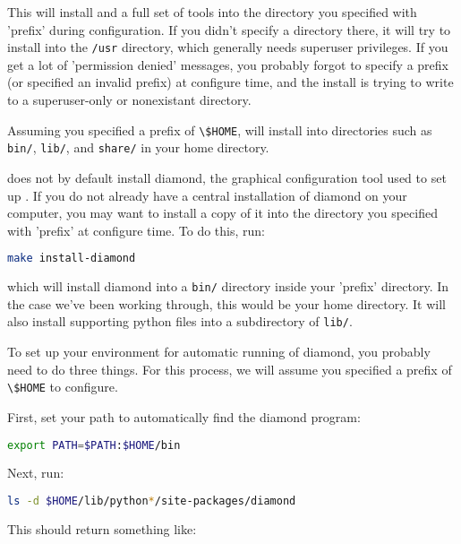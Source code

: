 This will install \fluidity and a full set of \fluidity tools into the
directory you specified with 'prefix' during configuration. If you didn't
specify a directory there, it will try to install into the
\lstinline[language=Bash]+/usr+ directory, which generally needs superuser
privileges. If you get a lot of 'permission denied' messages, you probably
forgot to specify a prefix (or specified an invalid prefix) at configure time,
and the install is trying to write to a superuser-only or nonexistant
directory. 

Assuming you specified a prefix of \lstinline[language=Bash]+\$HOME+, \fluidity
will install into directories such as \lstinline[language=Bash]+bin/+,
\lstinline[language=Bash]+lib/+, and \lstinline[language=Bash]+share/+ in your
home directory.

\fluidity does not by default install diamond, the graphical configuration tool
used to set up \fluidity. If you do not already have a central installation of
diamond on your computer, you may want to install a copy of it into the
directory you specified with 'prefix' at configure time. To do this, run:

\begin{lstlisting}[language=Bash]
make install-diamond
\end{lstlisting}

which will install diamond into a \lstinline[language=Bash]+bin/+ directory
inside your 'prefix' directory. In the case we've been working through, this
would be your home directory. It will also install supporting python files into
a subdirectory of \lstinline[language=Bash]+lib/+.

To set up your environment for automatic running of diamond, you probably need
to do three things. For this process, we will assume you specified a prefix of
\lstinline[language=Bash]+\$HOME+ to configure.

First, set your path to automatically find the diamond program:

\begin{lstlisting}[language=Bash]
export PATH=$PATH:$HOME/bin
\end{lstlisting}

Next, run:

\begin{lstlisting}[language=Bash]
ls -d $HOME/lib/python*/site-packages/diamond
\end{lstlisting}

This should return something like:

